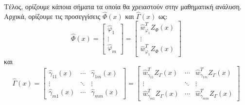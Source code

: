 Τέλος, ορίζουμε κάποια σήματα τα οποία θα χρειαστούν στην μαθηματική ανάλυση. Αρχικά, ορίζουμε τις προσεγγίσεις $\hat{\Phi}(x)$ και $\hat{\Gamma}(x)$ ως:
\begin{equation}
	\hat{\Phi}(x) = 
	\begin{bmatrix}
	\hat{\varphi}_1 \\ \vdots \\ \hat{\varphi}_m
	\end{bmatrix}
	= 
	\begin{bmatrix}
	 \hat{w}_{\varphi_1}^T Z_{\Phi}(x) \\ \vdots \\ \hat{w}_{\varphi_1}^T Z_{\Phi}(x)
	\end{bmatrix}
\end{equation}
και
\begin{equation}
\hat{\Gamma}(x) = 
\begin{bmatrix} \hat{\gamma}_{11}(x) & \cdots & \hat{\gamma}_{1m}(x) \\
	\vdots    & \ddots & \vdots         \\
	\hat{\gamma}_{m1}(x) & \cdots & \hat{\gamma}_{mm}(x)
\end{bmatrix}
=
\begin{bmatrix} \hat{w}_{\gamma_{11}}^T Z_{\Gamma}(x) & \cdots & \hat{w}_{\gamma_{1m}}^T Z_{\Gamma}(x) \\
\vdots    & \ddots & \vdots         \\
\hat{w}_{\gamma_{m1}}^T Z_{\Gamma}(x) & \cdots & \hat{w}_{\gamma_{mm}}^T Z_{\Gamma}(x)
\end{bmatrix}
\end{equation}


